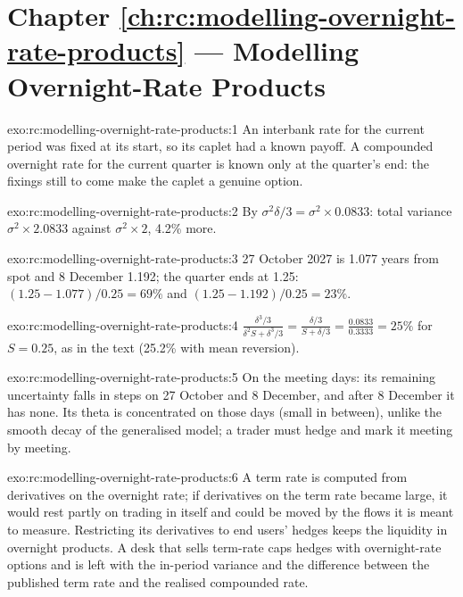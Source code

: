 \section*{Chapter \ref{ch:rc:modelling-overnight-rate-products} --- Modelling Overnight-Rate Products}

\begin{solution}{exo:rc:modelling-overnight-rate-products:1}
An interbank rate for the current period was fixed at its start, so its caplet had
a known payoff. A compounded overnight rate for the current quarter is known only at
the quarter's end: the fixings still to come make the caplet a genuine option.
\end{solution}

\begin{solution}{exo:rc:modelling-overnight-rate-products:2}
By $\sigma^2\delta/3 = \sigma^2\times0.0833$: total variance $\sigma^2\times2.0833$ against
$\sigma^2\times2$, 4.2\% more.
\end{solution}

\begin{solution}{exo:rc:modelling-overnight-rate-products:3}
27 October 2027 is 1.077 years from spot and 8 December 1.192; the quarter ends at
1.25: $(1.25-1.077)/0.25 = 69\%$ and $(1.25-1.192)/0.25 = 23\%$.
\end{solution}

\begin{solution}{exo:rc:modelling-overnight-rate-products:4}
$\frac{\delta^3/3}{\delta^2S+\delta^3/3} = \frac{\delta/3}{S+\delta/3} = \frac{0.0833}{0.3333} = 25\%$ for
$S=0.25$, as in the text (25.2\% with mean reversion).
\end{solution}

\begin{solution}{exo:rc:modelling-overnight-rate-products:5}
On the meeting days: its remaining uncertainty falls in steps on 27 October and 8
December, and after 8 December it has none. Its theta is concentrated on those days
(small in between), unlike the smooth decay of the generalised model; a trader must
hedge and mark it meeting by meeting.
\end{solution}

\begin{solution}{exo:rc:modelling-overnight-rate-products:6}
A term rate is computed from derivatives on the overnight rate; if derivatives on the
term rate became large, it would rest partly on trading in itself and could be moved
by the flows it is meant to measure. Restricting its derivatives to end users'
hedges keeps the liquidity in overnight products. A desk that sells term-rate caps
hedges with overnight-rate options and is left with the in-period variance and the
difference between the published term rate and the realised compounded rate.
\end{solution}

